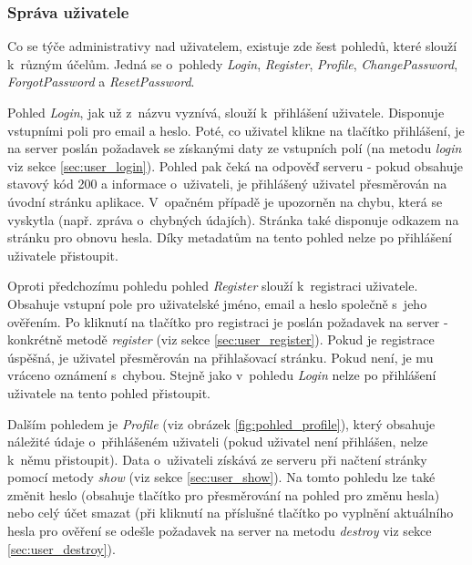 		\subsubsection{Správa uživatele} %
		Co se týče administrativy nad uživatelem, existuje zde šest pohledů, které slouží k~různým účelům. Jedná se o~pohledy \textit{Login}, \textit{Register}, \textit{Profile}, \textit{ChangePassword}, \textit{ForgotPassword} a \textit{ResetPassword}.
		
		Pohled \textit{Login}, jak už z~názvu vyznívá, slouží k~přihlášení uživatele. Disponuje vstupními poli pro email a heslo. Poté, co uživatel klikne na tlačítko přihlášení, je na server poslán požadavek se získanými daty ze vstupních polí (na metodu \textit{login} viz sekce \ref{sec:user_login}). Pohled pak čeká na odpověď serveru - pokud obsahuje stavový kód 200 a informace o~uživateli, je přihlášený uživatel přesměrován na úvodní stránku aplikace. V~opačném případě je upozorněn na chybu, která se vyskytla (např. zpráva o~chybných údajích). Stránka také disponuje odkazem na stránku pro obnovu hesla. Díky metadatům na tento pohled nelze po přihlášení uživatele přistoupit.
		
		Oproti předchozímu pohledu pohled \textit{Register} slouží k~registraci uživatele. Obsahuje vstupní pole pro uživatelské jméno, email a heslo společně s~jeho ověřením. Po kliknutí na tlačítko pro registraci je poslán požadavek na server - konkrétně metodě \textit{register} (viz sekce \ref{sec:user_register}). Pokud je registrace úspěšná, je uživatel přesměrován na přihlašovací stránku. Pokud není, je mu vráceno oznámení s~chybou. Stejně jako v~pohledu \textit{Login} nelze po přihlášení uživatele na tento pohled přistoupit. 
		
		Dalším pohledem je \textit{Profile} (viz obrázek \ref{fig:pohled_profile}), který obsahuje náležité údaje o~přihlášeném uživateli (pokud uživatel není přihlášen, nelze k~němu přistoupit). Data o~uživateli získává ze serveru při načtení stránky pomocí metody \textit{show} (viz sekce \ref{sec:user_show}). Na tomto pohledu lze také změnit heslo (obsahuje tlačítko pro přesměrování na pohled pro změnu hesla) nebo celý účet smazat (při kliknutí na příslušné tlačítko po vyplnění aktuálního hesla pro ověření se odešle požadavek na server na metodu \textit{destroy} viz sekce \ref{sec:user_destroy}).
		
